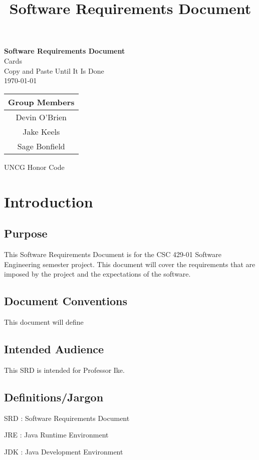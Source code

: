 \documentclass[12pt]{article}
\title{Software Requirements Document}
\begin{document}
\begin{titlepage}
\begin{center}
\Huge
\textbf{Software Requirements Document}\\
\huge Cards\\
\Large
Copy and Paste Until It Is Done\\
\Large \today\\
\begin{tabular}{|c|}
\hline
Group Members\\
\hline
Devin O'Brien\\
Jake Keels\\
Sage Bonfield\\
\hline
\end{tabular}
\large UNCG Honor Code
\end{center}
\end{titlepage}
\section{Introduction}\label{introduction}

\tableofcontents

\newpage
\subsection{Purpose}

This Software Requirements Document is for the CSC 429-01 Software
Engineering semester project. This document will cover the requirements
that are imposed by the project and the expectations of the software.


\subsection{Document Conventions}This document will define 

\subsection{Intended Audience}
This SRD is intended for Professor Ike. 

\subsection{Definitions/Jargon}
SRD : Software Requirements Document

JRE : Java Runtime Environment

JDK : Java Development Environment
\end{document}
